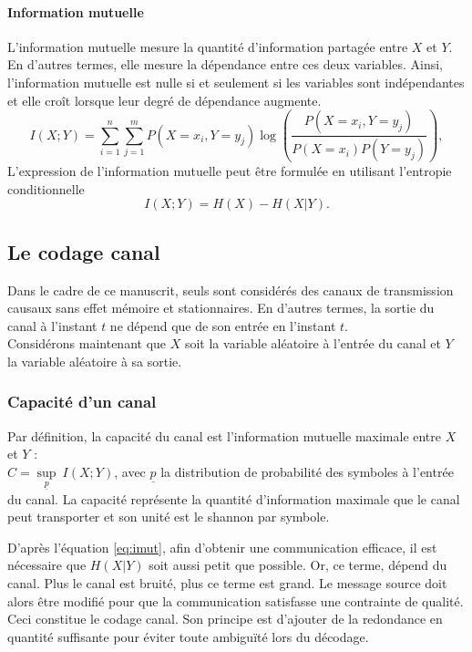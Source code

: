 \paragraph*{Information mutuelle}
L’information mutuelle mesure la quantité d'information partagée entre $X$ et $Y$. En d'autres termes, elle mesure la 
dépendance entre ces deux variables. Ainsi, l'information mutuelle est nulle si et seulement si les variables sont 
indépendantes et elle croît lorsque leur degré de dépendance augmente.
\[I(X;Y) = \sum\limits_{i=1}^n\sum\limits_{j=1}^m P(X=x_i,Y=y_j) \log\left(\frac{P(X=x_i, Y=y_j)}{P(X=x_i)P(Y=y_j)}\right),\]
L'expression de l'information mutuelle peut être formulée en utilisant l'entropie conditionnelle
\begin{equation}
	I(X;Y) = H(X) - H(X|Y).
	\label{eq:imut}
\end{equation}
\subsection{Le codage canal}
Dans le cadre de ce manuscrit, seuls sont considérés des canaux de transmission causaux sans effet mémoire et stationnaires. 
En d'autres termes, la sortie du canal à l'instant $t$ ne dépend que de son entrée en l'instant $t$.\\
Considérons maintenant que $X$ soit la variable aléatoire à l'entrée du canal et $Y$ la variable aléatoire à sa sortie.
\subsubsection{Capacité d'un canal}
Par définition, la capacité du canal est l'information mutuelle maximale entre $X$ et $Y$ : \\
$C=\sup\limits_{\underline{p}}\ I(X;Y)$, avec $\underline{p}$ la distribution de probabilité des symboles à l'entrée 
du canal. La capacité représente la quantité d'information maximale que le canal peut transporter et son unité est le 
shannon par symbole.

D'après l'équation \ref{eq:imut}, afin d'obtenir une communication efficace, il est nécessaire que $H(X|Y)$ soit aussi
petit que possible. Or, ce terme, dépend du canal. Plus le canal est bruité, plus ce terme est grand. Le message 
source doit alors être modifié pour que la communication satisfasse une contrainte de qualité. Ceci constitue le codage 
canal. Son principe est d'ajouter de la redondance en quantité suffisante pour éviter toute ambiguïté lors du décodage.

